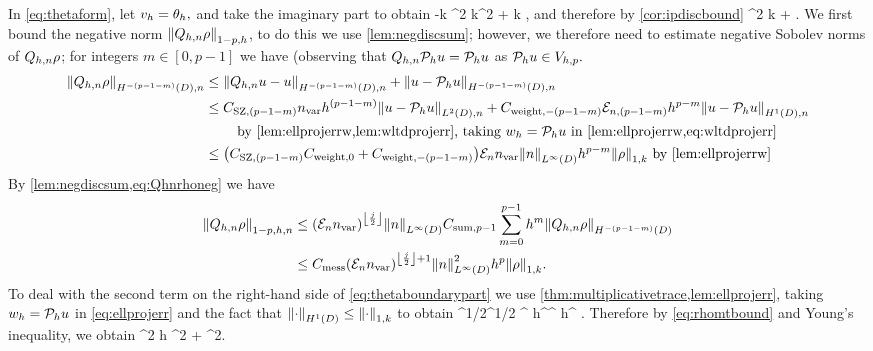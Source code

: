 In \cref{eq:thetaform}, let $v_{h} = \theta_{h},$ and take the imaginary part to obtain
\beqs
-k \NLtGI{\thetah}^2 \leq \Im k^2 \IPLtDn{\Qhn \rho}{\thetah} + \Re k \IPLtGI{\rho}{\thetah},
\eeqs
and therefore by \cref{cor:ipdiscbound}
\beq
\NLtGI{\thetah}^2 \leq  k  + \NLtGI{\rho}\NLtGI{\thetah}.\label{eq:thetaboundarypart}
\eeq
We first bound the negative norm $\Nfn{1-p,h}{\Qhn\rho}$, to do this we use \cref{lem:negdiscsum}; however, we therefore need to estimate negative Sobolev norms of $Q_{h,n}\rho$; for integers $m \in [0,p-1]$ we have (observing that $Q_{h,n} \mathcal P_{h} u = \mathcal P_{h} u$ as $\mathcal P_{h} u \in V_{h,p}.$
\begin{align}
\NHnfn{-(p-1-m)}{D}{\Qhn\rho} &\leq \NHnfn{-(p-1-m)}{D}{\Qhn u - u} + \NHnfn{-(p-1-m)}{D}{u - \Ph u}\nonumber\\
&\leq \CSZfn{(p-1-m)} \nvar h^{(p-1-m)} \NLtDn{u-\Ph u} + \Cwfn{-(p-1-m)}\errn{(p-1-m)} h^{p-m} \NHoDn{u - \Ph u}\\
&\quad\quad\text{ by \cref{lem:ellprojerrw,lem:wltdprojerr}, taking } \wh = \Ph u \text{ in \cref{lem:ellprojerrw,eq:wltdprojerr}}\nonumber\\
&\leq \mleft(\CSZfn{(p-1-m)} \Cwfn{0} + \Cwfn{-(p-1-m)}\mright)\En\nvar\NLiD{n} h^{p-m} \NW{\rho} \text{ by \cref{lem:ellprojerrw}}\label{eq:Qhnrhoneg}
\end{align}
By \cref{lem:negdiscsum,eq:Qhnrhoneg} we have
\begin{align}
\Nfn{1-p,h,n}{\Qhn \rho}&\leq \mleft(\En\nvar\mright)^{\floor{\frac{j}2}}\NLiD{n} \Csumfn{p-1} \sum_{m=0}^{p-1} h^{m} \NHfn{-(p-1-m)}{D}{\Qhn \rho} \nonumber\\
&\leq \Cmess \mleft(\En\nvar\mright)^{\floor{\frac{j}2}+1}\NLiD{n}^2 h^p \NW{\rho}.\label{eq:Qhnrhosum}
\end{align}
To deal with the second term on the right-hand side of \cref{eq:thetaboundarypart} we use \cref{thm:multiplicativetrace,lem:ellprojerr}, taking $w_{h} = \mathcal P_{h} u$ in \cref{eq:ellprojerr} and the fact that $\NHoD{\cdot} \leq \NW{\cdot}$ to obtain
\beq\label{eq:rhomtbound}
\NLtGI{\rho} \leq \CMT\NHoD{\rho}^{1/2}\NLtD{\rho}^{1/2} \leq \CMT {}^{\half} h^\half \NHoD{\rho}\leq \CMT {}^{\half} h^{\half} \NW{\rho}.
\eeq
Therefore by \cref{eq:rhomtbound} and Young's inequality, we obtain
\beq\label{eq:rhothetamt}
\NLtGI{\rho}\NLtGI{\thetah} \leq \half \CMT^2  h \NW{\rho}^2 + \half \NLtGI{\thetah}^2.
